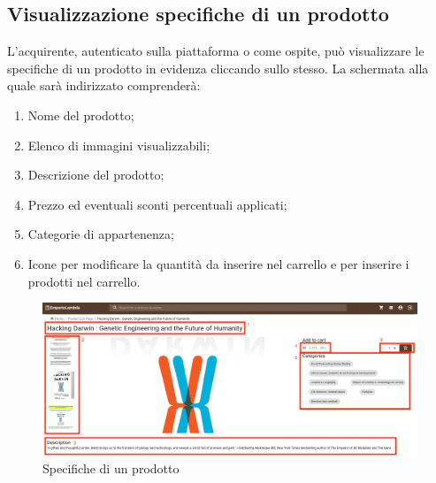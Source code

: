\subsection{Visualizzazione specifiche di un prodotto}
L'acquirente, autenticato sulla piattaforma o come ospite, può visualizzare le specifiche di un prodotto in evidenza cliccando sullo stesso. La schermata alla quale sarà indirizzato comprenderà:
\begin{enumerate}
	\item Nome del prodotto;
	\item Elenco di immagini visualizzabili;
	\item Descrizione del prodotto;
	\item Prezzo ed eventuali sconti percentuali applicati;
	\item Categorie di appartenenza;
	\item Icone per modificare la quantità da inserire nel carrello e per inserire i prodotti nel carrello.
\end{enumerate} 
\begin{figure}[H]
	\centering
	\includegraphics[scale=0.25]{Immagini/Acquirente/pdp.customer.png}
	\caption{Specifiche di un prodotto}
	\label{fig:SpecificheProdotto}
\end{figure}
